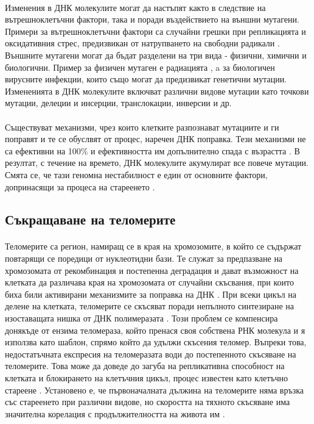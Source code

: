 \documentclass[pdftex,cyrillic,14pt,a4page,twoside,openright]{extreport}
\begin{document}
\paragraph{}
Изменения в ДНК молекулите могат да настъпят както в следствие на вътрешноклетъчни фактори, така и поради въздействието на външни мутагени. Примери за вътрешноклетъчни фактори са случайни грешки при репликацията и оксидативния стрес, предизвикан от натрупването на свободни радикали \cite{wang1998}. Външните мутагени могат да бъдат разделени на три вида - физични, химични и биологични. Пример за физичен мутаген е радиацията \cite{breimer1988}, a за биологичен вирусните инфекции, които също могат да предизвикат генетични мутации. Измененията в ДНК молекулите включват различни видове мутации като точкови мутации, делеции и инсерции, транслокации, инверсии и др.\\\\

Съществуват механизми, чрез които клетките разпознават мутациите и ги поправят и те се обуслвят от процес, наречен ДНК поправка. Тези механизми не са ефективни на 100\% и ефективността им допълнително спада с възрастта \cite{auley2017}. В резултат, с течение на времето, ДНК молекулите акумулират все повече мутации. Смята се, че тази геномна нестабилност е един от основните фактори, допринасящи за процеса на стареенето \cite{vijg2013}.

\subsection{Съкращаване на теломерите}
\paragraph{}
Теломерите са регион, намиращ се в края на хромозомите, в който се съдържат повтарящи се поредици от нуклеотидни бази. Те служат за предпазване на хромозомата от рекомбинация и постепенна деградация и дават възможност на клетката да различава края на хромозомата от случайни скъсвания, при които биха били активирани механизмите за поправка на ДНК \cite{griffith1999}. При всеки цикъл на делене на клетката, теломерите се скъсяват поради непълното синтезиране на изоставащата нишка от ДНК полимеразата \cite{koliada2015}. Този проблем се компенсира донякъде от ензима теломераза, който пренася своя собствена РНК молекула и я използва като шаблон, спрямо който да удължи скъсения теломер. Въпреки това, недостатъчната експресия на теломеразата води до постепенното скъсяване на теломерите. Това може да доведе до загуба на репликативна способност на клетката и блокирането на клетъчния цикъл, процес известен като клетъчно стареене \cite{muraki2012}. Установено е, че първоначалната дължина на теломерите няма връзка със стареенето при различни видове, но скоростта на тяхното скъсяване има значителна корелация с продължителността на живота им \cite{whittemore2019}.
\end{document}
